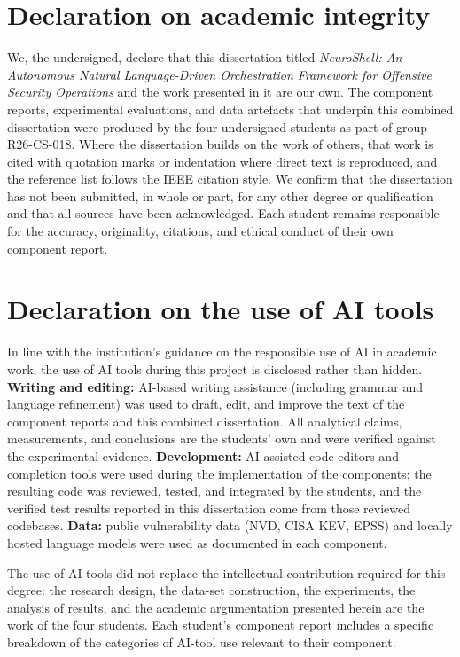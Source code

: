 \section{Declaration on academic integrity}

We, the undersigned, declare that this dissertation titled
\emph{NeuroShell: An Autonomous Natural Language-Driven Orchestration Framework
for Offensive Security Operations} and the work presented in it are our own. The
component reports, experimental evaluations, and data artefacts that underpin
this combined dissertation were produced by the four undersigned students as
part of group R26-CS-018. Where the dissertation builds on the work of others,
that work is cited with quotation marks or indentation where direct text is
reproduced, and the reference list follows the IEEE citation style. We confirm
that the dissertation has not been submitted, in whole or part, for any other
degree or qualification and that all sources have been acknowledged. Each
student remains responsible for the accuracy, originality, citations, and ethical
conduct of their own component report.

\section{Declaration on the use of AI tools}

In line with the institution's guidance on the responsible use of AI in academic
work, the use of AI tools during this project is disclosed rather than hidden.
\textbf{Writing and editing:} AI-based writing assistance (including grammar
and language refinement) was used to draft, edit, and improve the text of the
component reports and this combined dissertation. All analytical claims,
measurements, and conclusions are the students' own and were verified against
the experimental evidence. \textbf{Development:} AI-assisted code editors and
completion tools were used during the implementation of the components; the
resulting code was reviewed, tested, and integrated by the students, and the
verified test results reported in this dissertation come from those reviewed
codebases. \textbf{Data:} public vulnerability data (NVD, CISA KEV, EPSS) and
locally hosted language models were used as documented in each component.

The use of AI tools did not replace the intellectual contribution required for
this degree: the research design, the data-set construction, the experiments,
the analysis of results, and the academic argumentation presented herein are the
work of the four students. Each student's component report includes a specific
breakdown of the categories of AI-tool use relevant to their component.